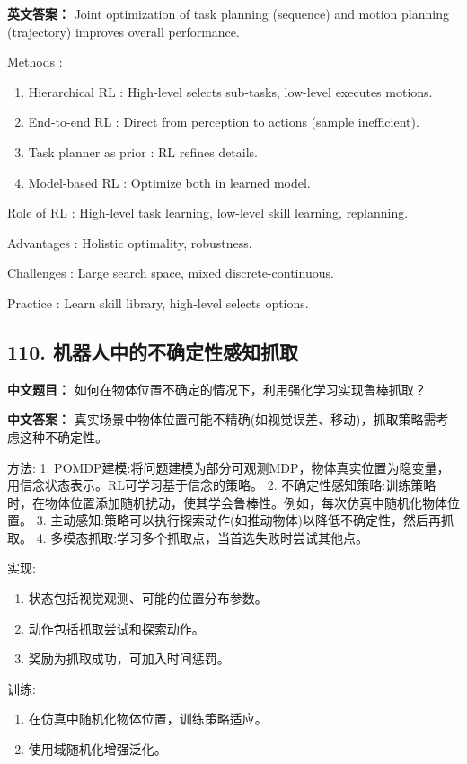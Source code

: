 \documentclass[10pt,a4paper]{ctexart}
\begin{document}
\textbf{英文答案：}  
Joint optimization of task planning (sequence) and motion planning (trajectory) improves overall performance.

 Methods :
\begin{enumerate}
    \item Hierarchical RL : High-level selects sub-tasks, low-level executes motions.
    \item End-to-end RL : Direct from perception to actions (sample inefficient).
    \item Task planner as prior : RL refines details.
    \item Model-based RL : Optimize both in learned model.
\end{enumerate}

 Role of RL : High-level task learning, low-level skill learning, replanning.

 Advantages : Holistic optimality, robustness.

 Challenges : Large search space, mixed discrete-continuous.

 Practice : Learn skill library, high-level selects options.

\subsection*{110. 机器人中的不确定性感知抓取}
\textbf{中文题目：} 如何在物体位置不确定的情况下，利用强化学习实现鲁棒抓取？

\textbf{中文答案：}  
真实场景中物体位置可能不精确(如视觉误差、移动)，抓取策略需考虑这种不确定性。

 方法:
1.  POMDP建模:将问题建模为部分可观测MDP，物体真实位置为隐变量，用信念状态表示。RL可学习基于信念的策略。
2.  不确定性感知策略:训练策略时，在物体位置添加随机扰动，使其学会鲁棒性。例如，每次仿真中随机化物体位置。
3.  主动感知:策略可以执行探索动作(如推动物体)以降低不确定性，然后再抓取。
4.  多模态抓取:学习多个抓取点，当首选失败时尝试其他点。

 实现:
\begin{enumerate}
    \item 状态包括视觉观测、可能的位置分布参数。
    \item 动作包括抓取尝试和探索动作。
    \item 奖励为抓取成功，可加入时间惩罚。
\end{enumerate}

 训练:
\begin{enumerate}
    \item 在仿真中随机化物体位置，训练策略适应。
    \item 使用域随机化增强泛化。
\end{enumerate}
\end{document}
